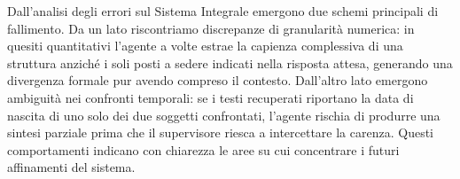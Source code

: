 Dall'analisi degli errori sul Sistema Integrale emergono due schemi principali di fallimento. Da un lato riscontriamo discrepanze di granularità numerica: in quesiti quantitativi l'agente a volte estrae la capienza complessiva di una struttura anziché i soli posti a sedere indicati nella risposta attesa, generando una divergenza formale pur avendo compreso il contesto. Dall'altro lato emergono ambiguità nei confronti temporali: se i testi recuperati riportano la data di nascita di uno solo dei due soggetti confrontati, l'agente rischia di produrre una sintesi parziale prima che il supervisore riesca a intercettare la carenza. Questi comportamenti indicano con chiarezza le aree su cui concentrare i futuri affinamenti del sistema.

